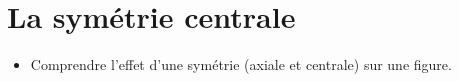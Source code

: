 \themaG
\graphicspath{{../../S12_Symetrie_centrale/Images/}}

\chapter{La symétrie centrale}
\label{S12}


\begin{prerequis}
   \begin{itemize}
      \item[\com] Comprendre l'effet d'une symétrie (axiale et centrale) sur une figure.
   \end{itemize}
\end{prerequis}

\vfill

